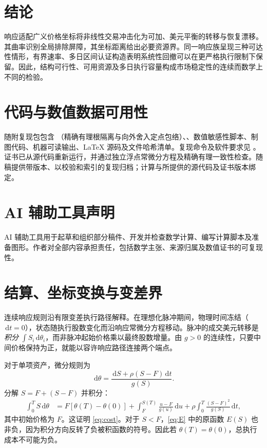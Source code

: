 \documentclass[11pt]{article}
\numberwithin{equation}{section}
\theoremstyle{definition}
\theoremstyle{remark}
\newcommand{\dd}{\,\mathrm{d}}
\begin{document}
\section{结论}\label{sec:conclusion}
响应适配广义价格坐标将非线性交易冲击化为可加、美元平衡的转移与恢复漂移。其曲率识别全局排除屏障，其坐标距离给出必要资源界。同一响应族呈现三种可达性情形，有界速率、多日区间认证构造表明系统性回撤可以在更严格执行限制下保留。因此，结构可行性、可用资源及多日执行容量构成市场稳定性的连续而数学上不同的检验。

\section*{代码与数值数据可用性}
随附复现包包含 （精确有理根隔离与向外舍入定点包络）、、数值敏感性脚本、制图代码、机器可读输出、LaTeX 源码及文件哈希清单。复现命令及软件要求见 。证书已从源代码重新运行，并通过独立浮点常微分方程及精确有理一致性检查。随稿提供带版本、以校验和索引的复现归档；计算与所提供的源代码及证书版本绑定。

\section*{AI 辅助工具声明}
AI 辅助工具用于起草和组织部分稿件、开发并检查数学计算、编写计算脚本及准备图形。作者对全部内容承担责任，包括数学主张、来源归属及数值证书的可复现性。

\appendix
\section{结算、坐标变换与变差界}\label{app:accounting}
连续响应规则沿有限变差执行路径解释。在理想化脉冲期间，物理时间冻结（$\dd t=0$），状态随执行股数变化而沿响应常微分方程移动。脉冲的成交美元转移是\emph{积分} $\int S_i\dd\theta_i$，而非脉冲起始价格乘以最终股数增量。由 $g>0$ 的连续性，只要中间价格保持为正，就能以容许响应路径连接两个端点。

对于单项资产，微分规则为
\begin{equation}\label{eq:appendix-s}
\dd\theta=\frac{\dd S+\rho(S-F)\dd t}{g(S)}.
\end{equation}
分解 $S=F+(S-F)$ 并积分：
\begin{align*}
\int_0^T S\dd\theta
&=F[\theta(T)-\theta(0)]
+\int_F^{S(T)}\frac{u-F}{g(u)}\dd u
+\rho\int_0^T\frac{(S-F)^2}{g(S)}\dd t,
\end{align*}
其中初始价格为 $F$。这证明 \eqref{eq:cost}。对于 $S<F$，\eqref{eq:E} 中的原函数 $E(S)$ 也非负，因为积分方向反转了负被积函数的符号。因此若 $\theta(T)=\theta(0)$，总执行成本不可能为负。
\end{document}

